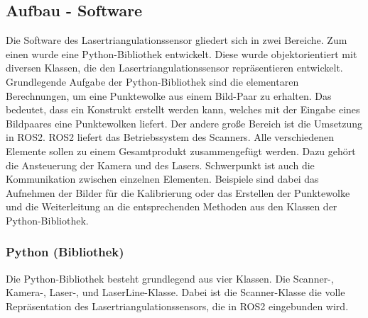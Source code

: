	
	\label{chap:aufbau_hardware}
	
	\newpage
	
	\subsection{Aufbau - Software}
	Die Software des Lasertriangulationssensor gliedert sich in zwei Bereiche. Zum einen wurde eine Python-Bibliothek entwickelt. Diese wurde objektorientiert mit diversen Klassen, die den Lasertriangulationssensor repräsentieren entwickelt. Grundlegende Aufgabe der Python-Bibliothek sind die elementaren Berechnungen, um eine Punktewolke aus einem Bild-Paar zu erhalten. Das bedeutet, dass ein Konstrukt erstellt werden kann, welches mit der Eingabe eines Bildpaares eine Punktewolken liefert. \newline
	Der andere große Bereich ist die Umsetzung in ROS2. ROS2 liefert das Betriebssystem des Scanners. Alle verschiedenen Elemente sollen zu einem Gesamtprodukt zusammengefügt werden. Dazu gehört die Ansteuerung der Kamera und des Lasers. Schwerpunkt ist auch die Kommunikation zwischen einzelnen Elementen. Beispiele sind dabei das Aufnehmen der Bilder für die Kalibrierung oder das Erstellen der Punktewolke und die Weiterleitung an die entsprechenden Methoden aus den Klassen der Python-Bibliothek.
		\subsubsection{Python (Bibliothek)}
		Die Python-Bibliothek besteht grundlegend aus vier Klassen. Die Scanner-, Kamera-, Laser-, und LaserLine-Klasse. Dabei ist die Scanner-Klasse die volle Repräsentation des Lasertriangulationssensors, die in ROS2 eingebunden wird.
		
